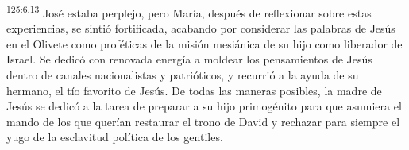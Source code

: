 \par
\textsuperscript{125:6.13} José estaba perplejo, pero María, después de reflexionar sobre estas experiencias, se sintió fortificada, acabando por considerar las palabras de Jesús en el Olivete como proféticas de la misión mesiánica de su hijo como liberador de Israel. Se dedicó con renovada energía a moldear los pensamientos de Jesús dentro de canales nacionalistas y patrióticos, y recurrió a la ayuda de su hermano, el tío favorito de Jesús. De todas las maneras posibles, la madre de Jesús se dedicó a la tarea de preparar a su hijo primogénito para que asumiera el mando de los que querían restaurar el trono de David y rechazar para siempre el yugo de la esclavitud política de los gentiles.